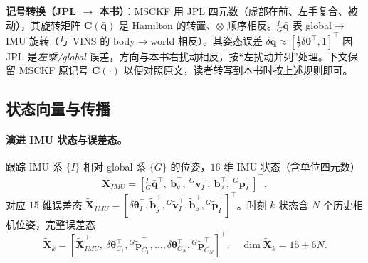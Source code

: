 \begin{note}
\textbf{记号转换（JPL $\to$ 本书）}：MSCKF 用 JPL 四元数（虚部在前、左手复合、被动），其旋转矩阵 $\mathbf{C}(\bar{\mathbf{q}})$ 是 Hamilton 的转置、$\otimes$ 顺序相反。${}^I_G\bar{\mathbf{q}}$ 表 global$\to$IMU 旋转（与 VINS 的 body$\to$world 相反）。其姿态误差 $\delta\bar{\mathbf{q}}\approx[\tfrac12\delta\boldsymbol{\theta}^\top,1]^\top$ 因 JPL 是\emph{左乘/global} 误差，方向与本书右扰动相反，按“左扰动并列”处理。下文保留 MSCKF 原记号 $\mathbf{C}(\cdot)$ 以便对照原文，读者转写到本书时按上述规则即可。
\end{note}

\subsection{状态向量与传播}
\label{sec:vio-msckf-state}

\paragraph{演进 IMU 状态与误差态。}
跟踪 IMU 系 $\{I\}$ 相对 global 系 $\{G\}$ 的位姿，$16$ 维 IMU 状态（含单位四元数）
\begin{equation}
  \mathbf{X}_{IMU}=[{}^I_G\bar{\mathbf{q}}^\top,\ \mathbf{b}_g^\top,\ {}^G\mathbf{v}_I^\top,\ \mathbf{b}_a^\top,\ {}^G\mathbf{p}_I^\top]^\top,
  \label{eq:vio-msckf-imu}
\end{equation}
对应 $15$ 维误差态 $\tilde{\mathbf{X}}_{IMU}=[\delta\boldsymbol{\theta}_I^\top,\tilde{\mathbf{b}}_g^\top,{}^G\tilde{\mathbf{v}}_I^\top,\tilde{\mathbf{b}}_a^\top,{}^G\tilde{\mathbf{p}}_I^\top]^\top$。时刻 $k$ 状态含 $N$ 个历史相机位姿，完整误差态
\begin{equation}
  \tilde{\mathbf{X}}_k=[\tilde{\mathbf{X}}_{IMU}^\top,\ \delta\boldsymbol{\theta}_{C_1}^\top,{}^G\tilde{\mathbf{p}}_{C_1}^\top,\dots,\delta\boldsymbol{\theta}_{C_N}^\top,{}^G\tilde{\mathbf{p}}_{C_N}^\top]^\top,
  \quad
  \dim\tilde{\mathbf{X}}_k=15+6N.
  \label{eq:vio-msckf-full}
\end{equation}

